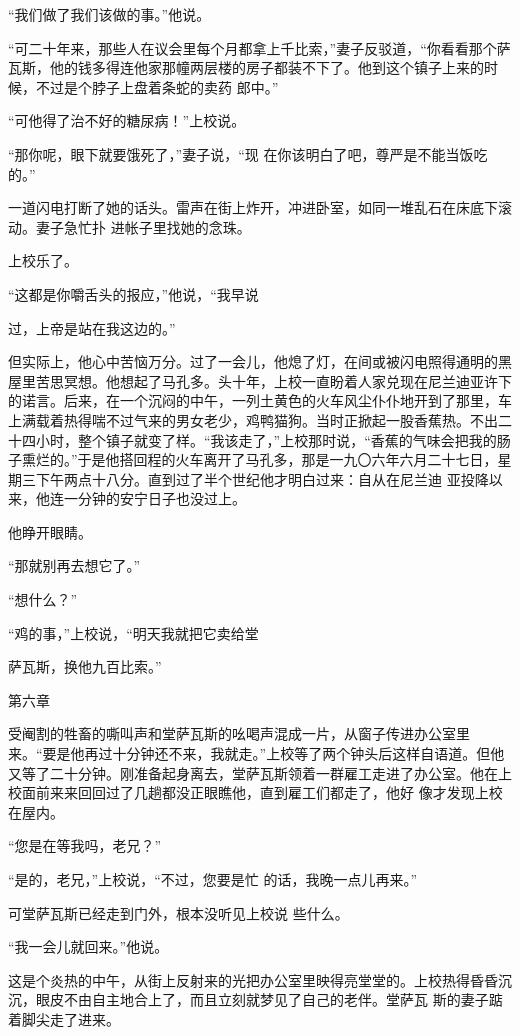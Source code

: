 \documentclass{article}
\begin{document}
“我们做了我们该做的事。”他说。 

“可二十年来，那些人在议会里每个月都拿上千比索，”妻子反驳道，“你看看那个萨瓦斯，他的钱多得连他家那幢两层楼的房子都装不下了。他到这个镇子上来的时候，不过是个脖子上盘着条蛇的卖药
郎中。” 


“可他得了治不好的糖尿病！”上校说。 

“那你呢，眼下就要饿死了，”妻子说，“现
在你该明白了吧，尊严是不能当饭吃的。” 

一道闪电打断了她的话头。雷声在街上炸开，冲进卧室，如同一堆乱石在床底下滚动。妻子急忙扑
进帐子里找她的念珠。 


上校乐了。 

“这都是你嚼舌头的报应，”他说，“我早说

\newpage
过，上帝是站在我这边的。” 

但实际上，他心中苦恼万分。过了一会儿，他熄了灯，在间或被闪电照得通明的黑屋里苦思冥想。他想起了马孔多。头十年，上校一直盼着人家兑现在尼兰迪亚许下的诺言。后来，在一个沉闷的中午，一列土黄色的火车风尘仆仆地开到了那里，车上满载着热得喘不过气来的男女老少，鸡鸭猫狗。当时正掀起一股香蕉热。不出二十四小时，整个镇子就变了样。“我该走了，”上校那时说，“香蕉的气味会把我的肠子熏烂的。”于是他搭回程的火车离开了马孔多，那是一九〇六年六月二十七日，星期三下午两点十八分。直到过了半个世纪他才明白过来：自从在尼兰迪
亚投降以来，他连一分钟的安宁日子也没过上。 


他睁开眼睛。 


“那就别再去想它了。” 


“想什么？” 

“鸡的事，”上校说，“明天我就把它卖给堂
\newpage

萨瓦斯，换他九百比索。” 



第六章 

受阉割的牲畜的嘶叫声和堂萨瓦斯的吆喝声混成一片，从窗子传进办公室里来。“要是他再过十分钟还不来，我就走。”上校等了两个钟头后这样自语道。但他又等了二十分钟。刚准备起身离去，堂萨瓦斯领着一群雇工走进了办公室。他在上校面前来来回回过了几趟都没正眼瞧他，直到雇工们都走了，他好
像才发现上校在屋内。 


“您是在等我吗，老兄？” 

“是的，老兄，”上校说，“不过，您要是忙
的话，我晚一点儿再来。” 

可堂萨瓦斯已经走到门外，根本没听见上校说
些什么。 

\newpage


“我一会儿就回来。”他说。 

这是个炎热的中午，从街上反射来的光把办公室里映得亮堂堂的。上校热得昏昏沉沉，眼皮不由自主地合上了，而且立刻就梦见了自己的老伴。堂萨瓦
斯的妻子踮着脚尖走了进来。 
\end{document}
